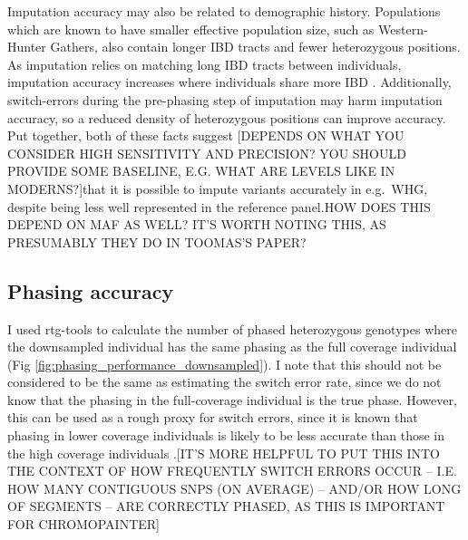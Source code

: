 Imputation accuracy may also be related to demographic history. Populations which are known to have smaller effective population size, such as Western-Hunter Gathers, also contain longer IBD tracts and fewer heterozygous positions. As imputation relies on matching long IBD tracts between individuals, imputation accuracy increases where individuals share more IBD \cite{kong2008detection}. Additionally, switch-errors during the pre-phasing step of imputation may harm imputation accuracy, so a reduced density of heterozygous positions can improve accuracy. Put together, both of these facts suggest {\color{red}[DEPENDS ON WHAT YOU CONSIDER HIGH SENSITIVITY AND PRECISION? YOU SHOULD PROVIDE SOME BASELINE, E.G. WHAT ARE LEVELS LIKE IN MODERNS?]that it is possible to impute variants accurately in e.g.\ WHG,} despite being less well represented in the reference panel.{\color{red}HOW DOES THIS DEPEND ON MAF AS WELL? IT'S WORTH NOTING THIS, AS PRESUMABLY THEY DO IN TOOMAS'S PAPER?}  

\subsection{Phasing accuracy}

I used rtg-tools to calculate the number of phased heterozygous genotypes where the downsampled individual has the same phasing as the full coverage individual (Fig \ref{fig:phasing_performance_downsampled}). I note that this should not be considered to be the same as estimating the switch error rate, since we do not know that the phasing in the full-coverage individual is the true phase. However, this can be used as a rough proxy for switch errors, since it is known that phasing in lower coverage individuals is likely to be less accurate than those in the high coverage individuals \cite{rubinacci2021efficient}.{\color{red}[IT'S MORE HELPFUL TO PUT THIS INTO THE CONTEXT OF HOW FREQUENTLY SWITCH ERRORS OCCUR -- I.E. HOW MANY CONTIGUOUS SNPS (ON AVERAGE) -- AND/OR HOW LONG OF SEGMENTS -- ARE CORRECTLY PHASED, AS THIS IS IMPORTANT FOR CHROMOPAINTER]}

